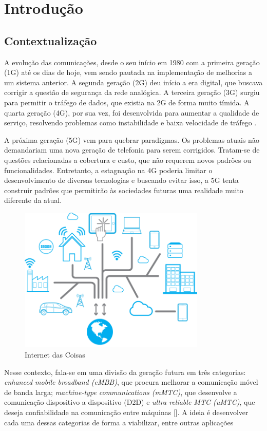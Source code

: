 \chapter{Introdução} \label{introducao}



\section{Contextualização} \label{contextualização}

A evolução das comunicações, desde o seu início em 1980 com a primeira geração (1G) até os dias de hoje, vem sendo pautada na implementação de melhorias a um sistema anterior. A segunda geração (2G) deu início a era digital, que buscava corrigir a questão de segurança da rede analógica. A terceira geração (3G) surgiu para permitir o tráfego de dados, que existia na 2G de forma muito tímida. A quarta geração (4G), por sua vez, foi desenvolvida para aumentar a qualidade de serviço, resolvendo problemas como instabilidade e baixa velocidade de tráfego \cite{Best}. 
\par A próxima geração (5G) vem para quebrar paradigmas. Os problemas atuais não demandariam uma nova geração de telefonia para serem corrigidos. Tratam-se de questões relacionadas a cobertura e custo, que não requerem novos padrões ou funcionalidades. Entretanto, a estagnação na 4G poderia limitar o desenvolvimento de diversas tecnologias e buscando evitar isso, a 5G tenta construir padrões que permitirão às sociedades futuras uma realidade muito diferente da atual.

\begin{figure}[h!]
\centering
\includegraphics[width=3.5in]{mtc.png}
\caption{Internet das Coisas}
\label{MTC}
\end{figure}

\par Nesse contexto, fala-se em uma divisão da geração futura em três categorias: \textit{enhanced mobile broadband (eMBB)}, que procura melhorar a comunicação móvel de banda larga; \textit{machine-type communications (mMTC)}, que desenvolve a comunicação dispositivo a dispositivo (D2D) e \textit{ultra reliable MTC (uMTC)}, que deseja confiabilidade na comunicação entre máquinas [\cite{Qualcomm}]. A ideia é desenvolver cada uma dessas categorias de forma a viabilizar, entre outras aplicações \cite{Wunder}



